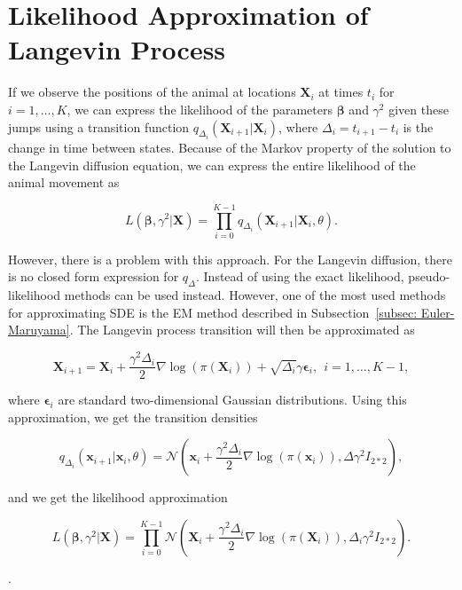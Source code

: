 \section{Likelihood Approximation of Langevin Process}
\label{sec: Likelihood Approximation of the Langevin Process}
If we observe the positions of the animal at locations $\textbf{X}_i$ at times $t_i$ for $i=1,\dots , K$, we can express the likelihood of the parameters $\bm{\beta}$ and $\gamma^2$ given these jumps using a transition function $q_{\Delta_i}(\textbf{X}_{i+1} | \textbf{X}_i)$, where $\Delta_i = t_{i+1} - t_i$ is the change in time between states. Because of the Markov property of the solution to the Langevin diffusion equation, we can express the entire likelihood of the animal movement as

\begin{equation}
    L(\bm{\beta}, \gamma^2 | \textbf{X}) = \prod_{i=0}^{K-1} q_{\Delta_i}(\textbf{X}_{i+1} | \textbf{X}_i, \theta).
    \label{eq: Langevin likelihood}
\end{equation}

However, there is a problem with this approach. For the Langevin diffusion, there is no closed form expression for $q_\Delta$\parencite{gloaguen_stochastic_2018}. Instead of using the exact likelihood, pseudo-likelihood methods can be used instead. However, one of the most used methods for approximating SDE is the EM method described in Subsection~\ref{subsec: Euler-Maruyama}. The Langevin process transition will then be approximated as

$$
    \textbf{X}_{i+1} = \textbf{X}_i + \frac{\gamma^2 \Delta_i}{2}\nabla \log(\pi(\textbf{X}_i)) + \sqrt{\Delta_i}\gamma \bm{\epsilon}_i, \ \ i = 1,\dots , K-1,
$$

where $\bm{\epsilon}_i$ are standard two-dimensional Gaussian distributions. Using this approximation, we get the transition densities 

$$
q_{\Delta_i}(\textbf{x}_{i+1} | \textbf{x}_i, \theta) = \mathcal{N}(\textbf{x}_i + \frac{\gamma^2 \Delta_i}{2}\nabla \log(\pi(\textbf{x}_i)), \Delta \gamma^2 I_{2*2}),
$$

and we get the likelihood approximation

$$
L(\bm{\beta}, \gamma^2 | \textbf{X}) = \prod_{i=0}^{K-1} \mathcal{N}(\textbf{X}_i + \frac{\gamma^2 \Delta_i}{2}\nabla \log(\pi(\textbf{X}_i)), \Delta_i \gamma^2 I_{2*2}).
$$

\parencite{iacus_simulation_2008}.






